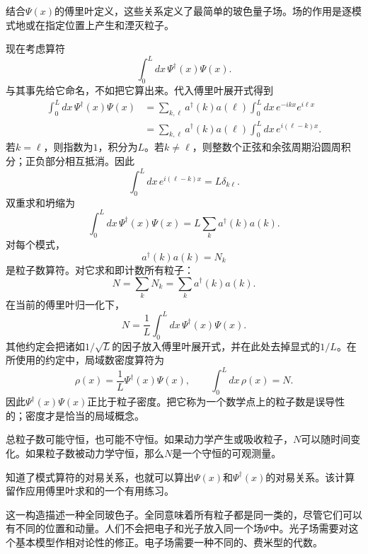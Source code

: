 结合\(\Psi(x)\)的傅里叶定义，这些关系定义了最简单的玻色量子场。场的作用是逐模式地或在指定位置上产生和湮灭粒子。

现在考虑算符
\begin{equation}
\int_0^L dx\,\Psi^\dagger(x)\Psi(x).
\end{equation}
与其事先给它命名，不如把它算出来。代入傅里叶展开式得到
\begin{align}
\int_0^L dx\,\Psi^\dagger(x)\Psi(x)
&=
\sum_{k,\ell}a^\dagger(k)a(\ell)
\int_0^L dx\,e^{-ikx}e^{i\ell x}
\\
&=
\sum_{k,\ell}a^\dagger(k)a(\ell)
\int_0^L dx\,e^{i(\ell-k)x}.
\end{align}
若\(k=\ell\)，则指数为\(1\)，积分为\(L\)。若\(k\ne\ell\)，则整数个正弦和余弦周期沿圆周积分；正负部分相互抵消。因此
\begin{equation}
\int_0^L dx\,e^{i(\ell-k)x}=L\delta_{k\ell}.
\end{equation}
双重求和坍缩为
\begin{equation}
\int_0^L dx\,\Psi^\dagger(x)\Psi(x)
=L\sum_k a^\dagger(k)a(k).
\end{equation}
对每个模式，
\begin{equation}
a^\dagger(k)a(k)=N_k
\end{equation}
是粒子数算符。对它求和即计数所有粒子：
\begin{equation}
N=\sum_k N_k=\sum_k a^\dagger(k)a(k).
\end{equation}
在当前的傅里叶归一化下，
\begin{equation}
N=\frac{1}{L}\int_0^L dx\,
\Psi^\dagger(x)\Psi(x).
\end{equation}
其他约定会把诸如\(1/\sqrt{L}\)的因子放入傅里叶展开式，并在此处去掉显式的\(1/L\)。在所使用的约定中，局域数密度算符为
\begin{equation}
\rho(x)=\frac{1}{L}\Psi^\dagger(x)\Psi(x),
\qquad
\int_0^L dx\,\rho(x)=N.
\end{equation}
因此\(\Psi^\dagger(x)\Psi(x)\)正比于粒子密度。把它称为一个数学点上的粒子数是误导性的；密度才是恰当的局域概念。

总粒子数可能守恒，也可能不守恒。如果动力学产生或吸收粒子，\(N\)可以随时间变化。如果粒子数被动力学守恒，那么\(N\)是一个守恒的可观测量。

知道了模式算符的对易关系，也就可以算出\(\Psi(x)\)和\(\Psi^\dagger(x)\)的对易关系。该计算留作应用傅里叶求和的一个有用练习。

这一构造描述一种全同玻色子。全同意味着所有粒子都是同一类的，尽管它们可以有不同的位置和动量。人们不会把电子和光子放入同一个场\(\Psi\)中。光子场需要对这个基本模型作相对论性的修正。电子场需要一种不同的、费米型的代数。

